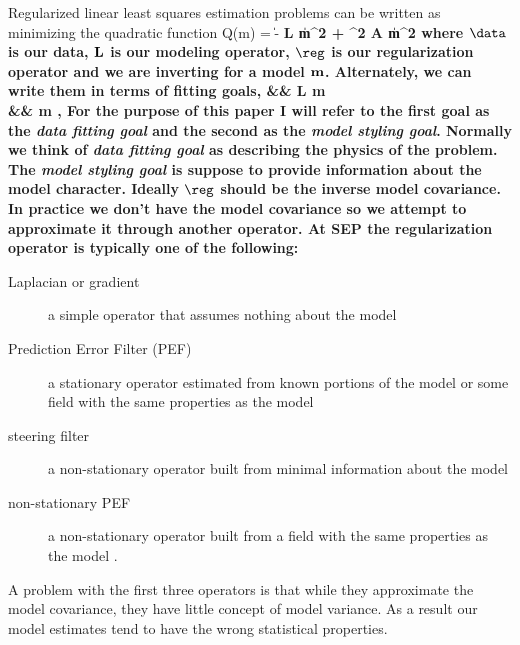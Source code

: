 Regularized linear least squares estimation
problems can be written as minimizing the quadratic
function
\beq
Q(m) = \|\data- \bf L \bf m\|^2 + \epsilon^2 \|\bf A \bf m\|^2
\eeq
where $\data$ is our data, $\bf L$ is our modeling operator,
$\reg$ is our regularization operator and we are inverting
for  a model $\bf m$.
Alternately, we can write  them
in terms of  fitting goals,
\beqa
\data &\approx& \bf L \bf m 
\label{eq:geophysics} \\
\nonumber
\zero &\approx& \epsilon  \reg \bf m 
,
\eeqa
For the purpose of this paper I will refer to the first
goal as the {\it data fitting goal} and the second as
the {\it model styling goal}.
Normally we think of {\it data fitting goal } as describing
the physics of the problem.  The {\it model styling goal} is suppose
to provide information about the model character.  Ideally 
$\reg$ should be the inverse model covariance.   In practice
we don't have the model covariance so we attempt  to approximate it through
another operator.   At SEP the regularization operator is  typically one
of the following:
\begin{description}
\item [Laplacian or gradient]  a simple operator that assumes nothing about the model
\item [Prediction Error Filter (PEF)]  a stationary operator  estimated from known portions of the model or  some field with the same properties as the model \cite[]{gee}
\item [steering filter] a non-stationary operator built from minimal information about the model \cite[]{Clapp.sep.95.bob1}
\item [non-stationary PEF] a non-stationary operator built from a field with the same properties as the model \cite[]{Crawley.sep.104}.
\end{description}
A problem with the first three operators is
that while they approximate the model covariance, they
have little concept of model variance.  As a result our model estimates  tend
to have the wrong statistical properties.

